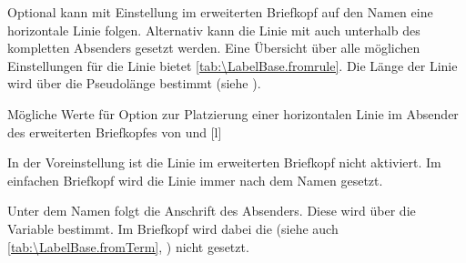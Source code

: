 Optional kann mit Einstellung
 im erweiterten Briefkopf auf den Namen eine
horizontale Linie
folgen. Alternativ kann die
Linie mit  auch unterhalb des kompletten
Absenders gesetzt werden. Eine Übersicht über alle möglichen Einstellungen für
die Linie bietet \autoref{tab:\LabelBase.fromrule}. Die Länge der Linie wird
über die Pseudolänge
bestimmt (siehe ).

\begin{table}
  \setcapindent{0pt}%
  \begin{captionbeside}
    {%
      \label{tab:\LabelBase.fromrule}%
      Mögliche Werte für Option  zur
      Platzierung einer horizontalen Linie im Absender des erweiterten
      Briefkopfes von  und %
    }%
    [l]%
    \begin{minipage}[t]{.6\linewidth}%
      \begin{desctabular}[t]
      \end{desctabular}
    \end{minipage}
  \end{captionbeside}
\end{table}

In der Voreinstellung ist die Linie im erweiterten
Briefkopf nicht aktiviert. Im einfachen Briefkopf wird die Linie immer nach
dem Namen gesetzt.

Unter dem Namen folgt die Anschrift des
Absenders. Diese wird über die Variable  bestimmt. Im
Briefkopf wird dabei die  (siehe auch
\autoref{tab:\LabelBase.fromTerm}, ) nicht
gesetzt.

